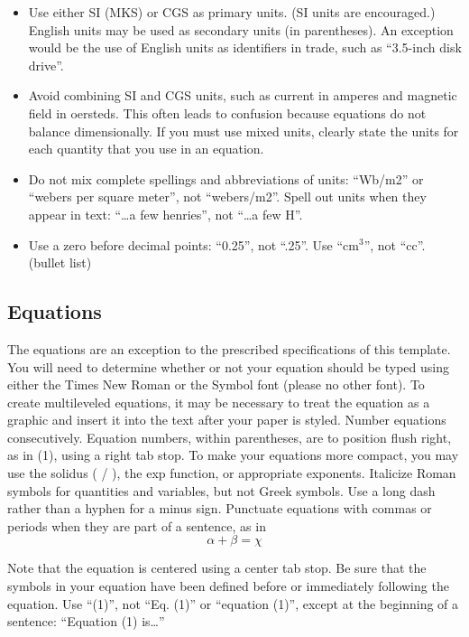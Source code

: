 \documentclass[spanish, letterpaper, 12 pt, conference]{ieeeconf}  %
\begin{document}
\begin{itemize}

\item Use either SI (MKS) or CGS as primary units. (SI units are encouraged.) English units may be used as secondary units (in parentheses). An exception would be the use of English units as identifiers in trade, such as ``3.5-inch disk drive''.
\item Avoid combining SI and CGS units, such as current in amperes and magnetic field in oersteds. This often leads to confusion because equations do not balance dimensionally. If you must use mixed units, clearly state the units for each quantity that you use in an equation.
\item Do not mix complete spellings and abbreviations of units: ``Wb/m2'' or ``webers per square meter'', not ``webers/m2''.  Spell out units when they appear in text: ``\ldots a few henries'', not ``\ldots a few H''.
\item Use a zero before decimal points: ``0.25'', not ``.25''. Use ``cm$^3$'', not ``cc''. (bullet list)

\end{itemize}


\subsection{Equations}

The equations are an exception to the prescribed specifications of this template. You will need to determine whether or not your equation should be typed using either the Times New Roman or the Symbol font (please no other font). To create multileveled equations, it may be necessary to treat the equation as a graphic and insert it into the text after your paper is styled. Number equations consecutively. Equation numbers, within parentheses, are to position flush right, as in (1), using a right tab stop. To make your equations more compact, you may use the solidus ( / ), the exp function, or appropriate exponents. Italicize Roman symbols for quantities and variables, but not Greek symbols. Use a long dash rather than a hyphen for a minus sign. Punctuate equations with commas or periods when they are part of a sentence, as in
\begin{equation}
\alpha + \beta = \chi
\end{equation}

Note that the equation is centered using a center tab stop. Be sure that the symbols in your equation have been defined before or immediately following the equation. Use ``(1)'', not ``Eq. (1)'' or ``equation (1)'', except at the beginning of a sentence: ``Equation (1) is\ldots''
\end{document}
